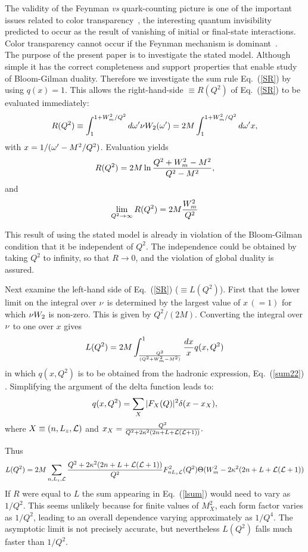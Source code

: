 \documentclass[aps,prd,amsmath,longbibliography]{revtex4-1}
\newcommand{\eq}[1]{Eq.~(\ref{#1})}
\def\bea{\begin{eqnarray}}
\def\eea{\end{eqnarray}}\def\a{\alpha}\newcommand{\bfk}{{\bf k}}\newcommand{\bfq}{{\bf q}}
\begin{document}
{The validity of the Feynman {\it vs} quark-counting picture is one of the important issues related to color transparency~\cite{Frankfurt:1994hf}, the interesting quantum invisibility predicted to occur as the result of vanishing of initial or final-state interactions.  Color transparency cannot 
 occur    if the Feynman mechanism is dominant~\cite{Frankfurt:1993es}.\\
 
 
 
    
    The purpose of the present paper is to investigate the stated model. Although simple it has the correct completeness and support properties that
    enable study of Bloom-Gilman duality. Therefore we investigate the sum rule \eq{SR} by 
    using $q(x)=1$. This   allows the right-hand-side $\equiv R(Q^2)$ of \eq{SR} to be  evaluated immediately:
    \bea  R(Q^2)\equiv \int_1^{1+W_m^2/Q^2}d\o'\n W_2(\o')=2M \int_1^{1+W_m^2/Q^2}d\o' x %
    ,\eea 
    with $x=1/(\omega'-M^2/Q^2)$.
    Evaluation yields 
    \bea R(Q^2)=2M\ln{Q^2+W_m^2-M^2\over Q^2-M^2},\eea
    and
    \bea \lim_{Q^2\to\infty} R(Q^2) =2M{W_m^2\over Q^2}\eea 

This result of using the stated model is already in violation of the Bloom-Gilman condition that it be independent of $Q^2$. The independence could be obtained by taking $Q^2$ to infinity, so that $R\to0$, and the violation of global duality is assured.

Next examine the left-hand side of \eq{SR} ($\equiv L(Q^2)$). First  that the lower limit on the integral over $\nu$ is determined by the largest value of $x\,(=1)$ for which  $\nu W_2$ is non-zero. This is given by $Q^2/(2M)$. Converting the integral over $\nu$ to one over $x$ gives
\bea L(Q^2)={2M} \int^1_{Q^2\over (Q^2+W_m^2-M^2)}      {dx\over x} q(x,Q^2)\label{L}\eea
in which $q(x,Q^2)$ is   to be obtained from the hadronic expression,  \eq{sum22} . Simplifying  the argument of the delta function leads to:
\bea q(x,Q^2)=\sum_X |F_X(Q)|^2 \d(x- x_{X}),\eea
where $X\equiv (n,L_z,{\cal L})$ and 
$ x_X={Q^2\over Q^2+ 2\kappa^2( 2n +L+{\cal L}({\cal L}+1))}.$
 
 Thus
 \bea L(Q^2)=2M\sum_{n,L_z,\cL}{Q^2+ 2\k^2( 2n +L+\cL(\cL+1))\over Q^2} F^2_{nL_z\cL}(Q^2)\Theta(W_m^2 -2\k^2(2n+L+\cL(\cL+1))\label{lsum}\eea
 If $R$ were equal to  $L$ the sum appearing in \eq{lsum} would need to vary as $1/Q^2$. This seems unlikely because for finite values of $M_X^2$, each form factor varies as $1/Q^2$, leading to an overall dependence varying approximately as $1/Q^4$. The asymptotic limit is not precisely accurate, but nevertheless $L(Q^2)$ falls much faster than $1/Q^2$. 
 
}
\end{document}
